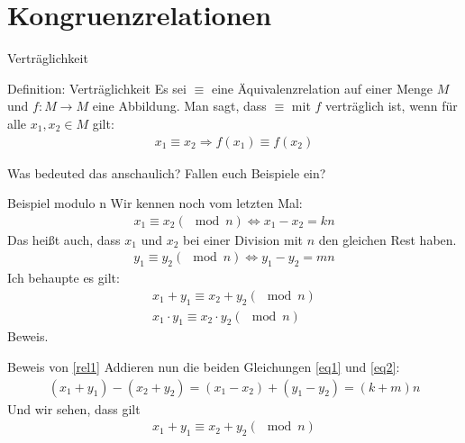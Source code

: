 \section{Kongruenzrelationen}
\begin{frame}{Verträglichkeit}
    \begin{block}{Definition: Verträglichkeit}
        Es sei $\equiv$ eine Äquivalenzrelation auf einer Menge $M$ und $f: M\rightarrow M$ eine Abbildung. Man sagt, dass $\equiv$ mit $f$ verträglich ist, wenn für alle $x_1, x_2 \in M$ gilt:
        \begin{align*}
            x_1 \equiv x_2 \Longrightarrow f\left( x_1 \right) \equiv f\left( x_2 \right)
        \end{align*}
    \end{block}
    Was bedeuted das anschaulich? Fallen euch Beispiele ein?
\end{frame}
\begin{frame}{Beispiel modulo n}
    Wir kennen noch vom letzten Mal:
    \begin{align}
        x_1 \equiv x_2 \left( \mod n \right) \Leftrightarrow x_1 -x_2 = kn\label{eq1}
    \end{align}
    \pause
    Das heißt auch, dass $x_1$ und $x_2$ bei einer Division mit $n$ den gleichen Rest haben.
    \pause
    \begin{align}
        y_1 \equiv y_2 \left( \mod n \right) \Leftrightarrow y_1 - y_2 = mn\label{eq2}
    \end{align}
    \pause
    Ich behaupte es gilt:
    \begin{align}
        x_1 + y_1 \equiv x_2  + y_2 \left( \mod n \right)\label{rel1}\\
        x_1 \cdot y_1 \equiv x_2 \cdot y_2 \left( \mod n \right)\label{rel2}
    \end{align}
    Beweis.
\end{frame}
\begin{frame}{Beweis von \eqref{rel1}}
    Addieren nun die beiden Gleichungen \eqref{eq1} und \eqref{eq2}:
    \pause
    \begin{align*}
        \left( x_1 + y_1 \right) - \left( x_2 + y_2 \right) = \left( x_1 - x_2 \right) + \left( y_1 - y_2 \right) = \left( k + m \right) n
    \end{align*}
    \pause
    Und wir sehen, dass gilt
    \begin{align*}
        x_1 + y_1 \equiv x_2 + y_2 \left( \mod n \right)
    \end{align*}
\end{frame}
